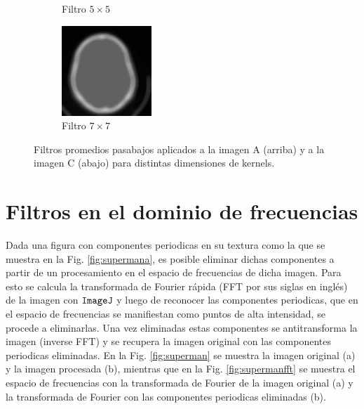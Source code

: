 \documentclass[letterpaper,12pt]{article}
\theoremstyle{plain}
\begin{document}
\begin{figure}[H]
\begin{subfigure}[h]{0.24\linewidth}
            \caption{\centering Filtro $5\times5$} 
         \end{subfigure}
         \begin{subfigure}[h]{0.24\linewidth}
            \centering
            \includegraphics[width=\textwidth]{Figuras/ImagenC7x7.png}
            \caption{\centering Filtro $7\times7$} 
         \end{subfigure}
    \caption{Filtros promedios pasabajos aplicados a la imagen A (arriba) y a la imagen C (abajo) para distintas dimensiones de kernels.}
    \label{fig:Pasabajo}
\end{figure}


\section{Filtros en el dominio de frecuencias\label{sec:ej5}}

\vspace{0.3cm}

Dada una figura con componentes periodicas en su textura como la que se muestra en la Fig. \ref{fig:supermana}, es posible eliminar dichas componentes a partir de un procesamiento en el espacio de frecuencias de dicha imagen. Para esto se calcula la transformada de Fourier rápida (FFT por sus siglas en inglés) de la imagen con $\verb|ImageJ|$ y luego de reconocer las componentes periodicas, que en el espacio de frecuencias se manifiestan como puntos de alta intensidad, se procede a eliminarlas. Una vez eliminadas estas componentes se antitransforma la imagen (inverse FFT) y se recupera la imagen original con las componentes periodicas eliminadas. En la Fig. \ref{fig:superman} se muestra la imagen original (a) y la imagen procesada (b), mientras que en la Fig. \ref{fig:supermanfft} se muestra el espacio de frecuencias con la transformada de Fourier de la imagen original (a) y la transformada de Fourier con las componentes periodicas eliminadas (b). 
\end{document}
